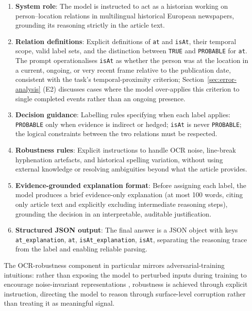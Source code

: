 \documentclass[
]{ceurart}
\theoremstyle{definition}
\begin{document}
\begin{enumerate}[noitemsep]
  \item \textbf{System role}: The model is instructed to act as a historian working on person--location relations in multilingual historical European newspapers, grounding its reasoning strictly in the article text.
  \item \textbf{Relation definitions}: Explicit definitions of \texttt{at} and \texttt{isAt}, their temporal scope, valid label sets, and the distinction between \texttt{TRUE} and \texttt{PROBABLE} for \texttt{at}. The prompt operationalises \texttt{isAt} as whether the person was at the location in a current, ongoing, or very recent frame relative to the publication date, consistent with the task's temporal-proximity criterion; Section~\ref{sec:error-analysis} (E2) discusses cases where the model over-applies this criterion to single completed events rather than an ongoing presence.
  \item \textbf{Decision guidance}: Labelling rules specifying when each label applies: \texttt{PROBABLE} only when evidence is indirect or hedged; \texttt{isAt} is never \texttt{PROBABLE}; the logical constraints between the two relations must be respected.
  \item \textbf{Robustness rules}: Explicit instructions to handle OCR noise, line-break hyphenation artefacts, and historical spelling variation, without using external knowledge or resolving ambiguities beyond what the article provides.
  \item \textbf{Evidence-grounded explanation format}: Before assigning each label, the model produces a brief evidence-only explanation (at most 100 words, citing only article text and explicitly excluding intermediate reasoning steps), grounding the decision in an interpretable, auditable justification.
  \item \textbf{Structured JSON output}: The final answer is a JSON object with keys \texttt{at\_explanation}, \texttt{at}, \texttt{isAt\_explanation}, \texttt{isAt}, separating the reasoning trace from the label and enabling reliable parsing.
\end{enumerate}

The OCR-robustness component in particular mirrors adversarial-training intuitions: rather than exposing the model to perturbed inputs during training to encourage noise-invariant representations \citep{ali2025multilingual}, robustness is achieved through explicit instruction, directing the model to reason through surface-level corruption rather than treating it as meaningful signal.
\end{document}

